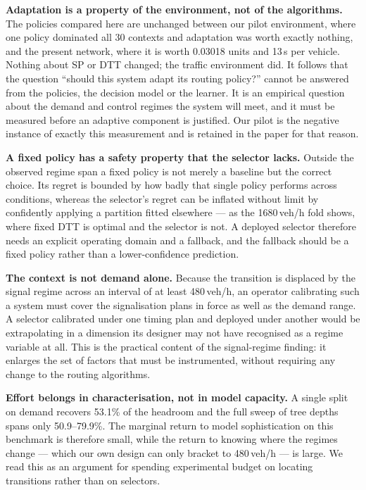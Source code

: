 \documentclass[10pt,a4paper]{article}
\begin{document}
\textbf{Adaptation is a property of the environment, not of the algorithms.} The policies compared here are unchanged between our pilot environment, where one policy dominated all 30 contexts and adaptation was worth exactly nothing, and the present network, where it is worth 0.03018 units and 13\,s per vehicle. Nothing about SP or DTT changed; the traffic environment did. It follows that the question ``should this system adapt its routing policy?'' cannot be answered from the policies, the decision model or the learner. It is an empirical question about the demand and control regimes the system will meet, and it must be measured before an adaptive component is justified. Our pilot is the negative instance of exactly this measurement and is retained in the paper for that reason.

\textbf{A fixed policy has a safety property that the selector lacks.} Outside the observed regime span a fixed policy is not merely a baseline but the correct choice. Its regret is bounded by how badly that single policy performs across conditions, whereas the selector's regret can be inflated without limit by confidently applying a partition fitted elsewhere --- as the 1680\,veh/h fold shows, where fixed DTT is optimal and the selector is not. A deployed selector therefore needs an explicit operating domain and a fallback, and the fallback should be a fixed policy rather than a lower-confidence prediction.

\textbf{The context is not demand alone.} Because the transition is displaced by the signal regime across an interval of at least 480\,veh/h, an operator calibrating such a system must cover the signalisation plans in force as well as the demand range. A selector calibrated under one timing plan and deployed under another would be extrapolating in a dimension its designer may not have recognised as a regime variable at all. This is the practical content of the signal-regime finding: it enlarges the set of factors that must be instrumented, without requiring any change to the routing algorithms.

\textbf{Effort belongs in characterisation, not in model capacity.} A single split on demand recovers 53.1\% of the headroom and the full sweep of tree depths spans only 50.9--79.9\%. The marginal return to model sophistication on this benchmark is therefore small, while the return to knowing where the regimes change --- which our own design can only bracket to 480\,veh/h --- is large. We read this as an argument for spending experimental budget on locating transitions rather than on selectors.
\end{document}
